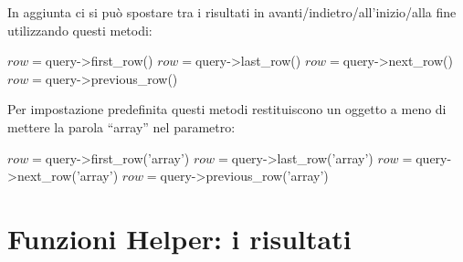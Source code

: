 \begin{itemize}
In aggiunta ci si può spostare tra i risultati in avanti/indietro/all'inizio/alla fine utilizzando questi metodi:

\begin{code}
$row = $query->first_row()
$row = $query->last_row()
$row = $query->next_row()
$row = $query->previous_row()
\end{code}

Per impostazione predefinita questi metodi restituiscono un oggetto a meno di mettere la parola ``array'' nel parametro:

\begin{code}
$row = $query->first_row('array')
$row = $query->last_row('array')
$row = $query->next_row('array')
$row = $query->previous_row('array')
\end{code}
\end{itemize}

\section*{Funzioni Helper: i risultati}

